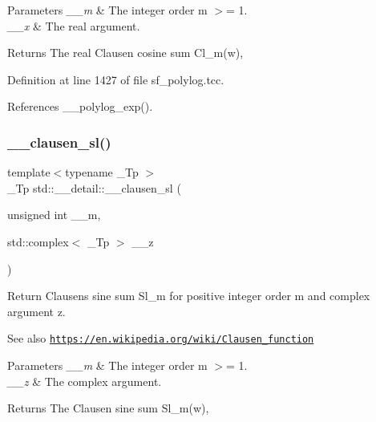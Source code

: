 \begin{DoxyParams}{Parameters}
{\em \+\_\+\+\_\+m} & The integer order m $>$= 1. \\
\hline
{\em \+\_\+\+\_\+x} & The real argument. \\
\hline
\end{DoxyParams}
\begin{DoxyReturn}{Returns}
The real Clausen cosine sum Cl\+\_\+m(w), 
\end{DoxyReturn}


Definition at line 1427 of file sf\+\_\+polylog.\+tcc.



References \+\_\+\+\_\+polylog\+\_\+exp().

\mbox{\label{namespacestd_1_1____detail_ab7d250f236ef63ed8bd260881b73524d}} 
\subsubsection{\texorpdfstring{\+\_\+\+\_\+clausen\+\_\+sl()}{\_\_clausen\_sl()}\hspace{0.1cm}{\footnotesize\ttfamily [1/2]}}
{\footnotesize\ttfamily template$<$typename \+\_\+\+Tp $>$ \\
\+\_\+\+Tp std\+::\+\_\+\+\_\+detail\+::\+\_\+\+\_\+clausen\+\_\+sl (\begin{DoxyParamCaption}\item[{unsigned int}]{\+\_\+\+\_\+m,  }\item[{std\+::complex$<$ \+\_\+\+Tp $>$}]{\+\_\+\+\_\+z }\end{DoxyParamCaption})}

Return Clausen\textquotesingle{}s sine sum Sl\+\_\+m for positive integer order m and complex argument z. \begin{DoxySeeAlso}{See also}
\href{https://en.wikipedia.org/wiki/Clausen_function}{\tt https\+://en.\+wikipedia.\+org/wiki/\+Clausen\+\_\+function}
\end{DoxySeeAlso}

\begin{DoxyParams}{Parameters}
{\em \+\_\+\+\_\+m} & The integer order m $>$= 1. \\
\hline
{\em \+\_\+\+\_\+z} & The complex argument. \\
\hline
\end{DoxyParams}
\begin{DoxyReturn}{Returns}
The Clausen sine sum Sl\+\_\+m(w), 
\end{DoxyReturn}



